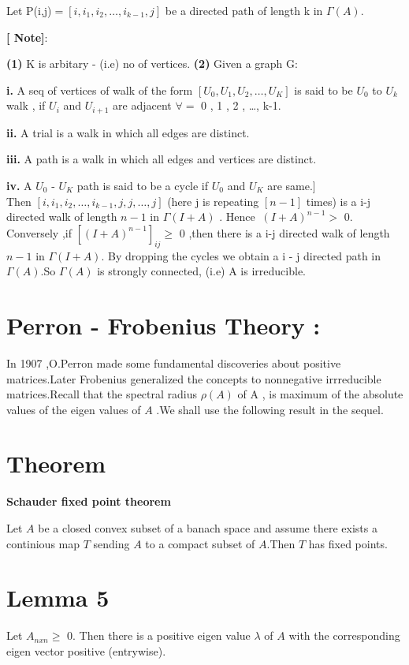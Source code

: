 Let P(i,j)$ = [ i , i_{1} , i_{2} ,\ldots, i_{k-1} , j ] $ be a directed path of length k in $\Gamma (A) $.

{\bf [ Note]}:

{\bf (1) } K is arbitary - (i.e) no of vertices.
{\bf (2) } Given a graph G:

{\bf i.} A seq of vertices of walk of the form $[U_{0} , U_{1} , U_{2} , \ldots ,U_{K}]$ is said to be $U_{0}$ to $U_{k}$ walk 
, if  $U_{i}$ and $U_{i+1}$ are adjacent $\forall  =$ 0 , 1 , 2 , \ldots, k-1.

{\bf ii.} A trial is a walk in which all edges are distinct.

{\bf iii.} A path is a walk in which all edges and vertices are distinct.

{\bf iv.} A $U_{0}$ - $U_{K}$ path is said to be a cycle if $U_{0}$ and $U_{K}$ are same.]
 \\
 
 
 Then  $[ i , i_{1} , i_{2} ,\ldots, i_{k-1} , j , j , \ldots, j ]$ (here j is repeating $[n-1]$ times) is a i-j 
 directed walk of length $n-1$ in $\Gamma (I+A) $ .
 Hence $\ (I+A)^{n-1}  > $ 0.
 Conversely ,if $[(I+A)^{n-1}]_{ij} \geq $ 0 ,then there is a i-j directed walk of length $n-1$ in $\Gamma (I+A)$.
 By dropping the cycles we obtain a i - j directed path in $ \Gamma (A)$.So $\Gamma (A)$ is strongly connected, (i.e) A is 
 irreducible.


\section{Perron - Frobenius Theory : }
In 1907 ,O.Perron made some fundamental discoveries about positive matrices.Later Frobenius generalized the concepts to 
nonnegative irrreducible matrices.Recall that the spectral radius $\rho(A) $ of A  , is maximum of the absolute values of the
eigen values of $A$ .We shall use the following result in the sequel.

\section{Theorem}

{\bf Schauder fixed point theorem }

Let $A$ be a closed convex subset of a banach space and assume there exists a continious map $T$ sending $A$ to a compact subset of 
$A$.Then $T$ has fixed points.

\section{Lemma 5}
Let $ A_{nxn} \geq  $ 0. Then there is a positive eigen value $\lambda $ of $A$ with the corresponding eigen vector positive 
(entrywise).

